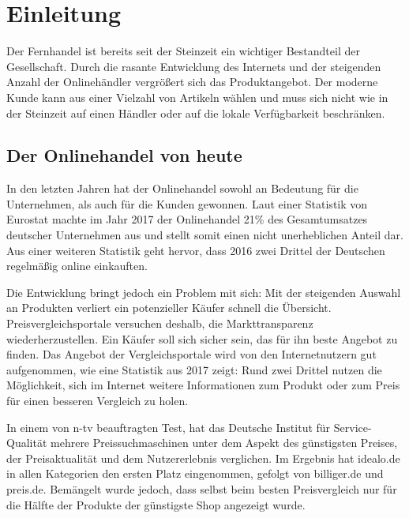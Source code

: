 \section{Einleitung}
\label{sec:einleitung}

Der Fernhandel ist bereits seit der Steinzeit ein wichtiger Bestandteil der Gesellschaft.
Durch die rasante Entwicklung des Internets und der steigenden Anzahl der Onlinehändler vergrößert sich das
Produktangebot.
Der moderne Kunde kann aus einer Vielzahl von Artikeln wählen und muss sich nicht wie in der Steinzeit auf einen
Händler oder auf die lokale Verfügbarkeit beschränken.

\subsection{Der Onlinehandel von heute}
\label{subsec:onlinehandel-heute}

\begin{comment}
    https://de.statista.com/statistik/studie/id/23510/dokument/e-commerce-in-europa-statista-dossier/
    https://de.statista.com/statistik/studie/id/6558/dokument/produktvergleich-im-internet-statista-dossier/
\end{comment}


In den letzten Jahren hat der Onlinehandel sowohl an Bedeutung für die Unternehmen, als auch für die Kunden gewonnen.
Laut einer Statistik von Eurostat machte im Jahr 2017 der Onlinehandel 21\% des Gesamtumsatzes deutscher Unternehmen
aus und stellt somit einen nicht unerheblichen Anteil dar.
Aus einer weiteren Statistik geht hervor, dass 2016 zwei Drittel der Deutschen regelmäßig online einkauften.

Die Entwicklung bringt jedoch ein Problem mit sich: Mit der steigenden Auswahl an Produkten verliert ein
potenzieller Käufer schnell die Übersicht.
Preisvergleichsportale versuchen deshalb, die Markttransparenz wiederherzustellen.
Ein Käufer soll sich sicher sein, das für ihn beste Angebot zu finden.
Das Angebot der Vergleichsportale wird von den Internetnutzern gut aufgenommen, wie eine Statistik aus 2017 zeigt:
Rund zwei Drittel nutzen die Möglichkeit, sich im Internet weitere Informationen zum Produkt oder zum Preis für einen
besseren Vergleich zu holen.

In einem von n-tv beauftragten Test, hat das Deutsche Institut für Service-Qualität mehrere Preissuchmaschinen unter
dem Aspekt des günstigsten Preises, der Preisaktualität und dem Nutzererlebnis verglichen.
Im Ergebnis hat idealo.de in allen Kategorien den ersten Platz eingenommen, gefolgt von billiger.de und preis.de.
Bemängelt wurde jedoch, dass selbst beim besten Preisvergleich nur für die Hälfte der Produkte der günstigste Shop
angezeigt wurde.

